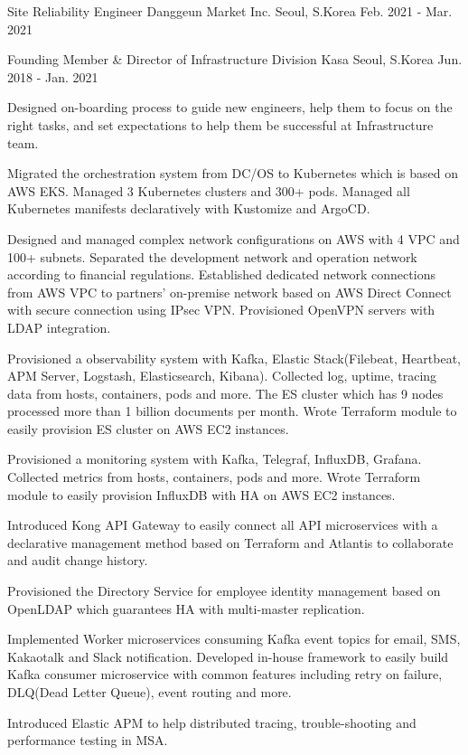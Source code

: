 \begin{cventries}
  \cventry
    {Site Reliability Engineer} %
    {Danggeun Market Inc.} %
    {Seoul, S.Korea} %
    {Feb. 2021 - Mar. 2021} %
    {
    }

  \cventry
    {Founding Member \& Director of Infrastructure Division} %
    {Kasa} %
    {Seoul, S.Korea} %
    {Jun. 2018 - Jan. 2021} %
    {
      \begin{cvitems} %
        \item {Designed on-boarding process to guide new engineers, help them to focus on the right tasks, and set expectations to help them be successful at Infrastructure team.}
        \item {Migrated the orchestration system from DC/OS to Kubernetes which is based on AWS EKS. Managed 3 Kubernetes clusters and 300+ pods. Managed all Kubernetes manifests declaratively with Kustomize and ArgoCD.}
        \item {Designed and managed complex network configurations on AWS with 4 VPC and 100+ subnets. Separated the development network and operation network according to financial regulations. Established dedicated network connections from AWS VPC to partners' on-premise network based on AWS Direct Connect with secure connection using IPsec VPN. Provisioned OpenVPN servers with LDAP integration.}
        \item {Provisioned a observability system with Kafka, Elastic Stack(Filebeat, Heartbeat, APM Server, Logstash, Elasticsearch, Kibana). Collected log, uptime, tracing data from hosts, containers, pods and more. The ES cluster which has 9 nodes processed more than 1 billion documents per month. Wrote Terraform module to easily provision ES cluster on AWS EC2 instances.}
        \item {Provisioned a monitoring system with Kafka, Telegraf, InfluxDB, Grafana. Collected metrics from hosts, containers, pods and more. Wrote Terraform module to easily provision InfluxDB with HA on AWS EC2 instances.}
        \item {Introduced Kong API Gateway to easily connect all API microservices with a declarative management method based on Terraform and Atlantis to collaborate and audit change history.}
        \item {Provisioned the Directory Service for employee identity management based on OpenLDAP which guarantees HA with multi-master replication.}
        \item {Implemented Worker microservices consuming Kafka event topics for email, SMS, Kakaotalk and Slack notification. Developed in-house framework to easily build Kafka consumer microservice with common features including retry on failure, DLQ(Dead Letter Queue), event routing and more.}
        \item {Introduced Elastic APM to help distributed tracing, trouble-shooting and performance testing in MSA.}
      \end{cvitems}
    }


\end{cventries}
